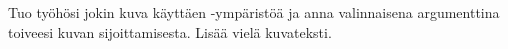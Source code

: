     \begin{harj}
        Tuo työhösi jokin kuva käyttäen -ympäristöä ja anna valinnaisena argumenttina toiveesi kuvan sijoittamisesta. Lisää vielä kuvateksti.
    \end{harj}
